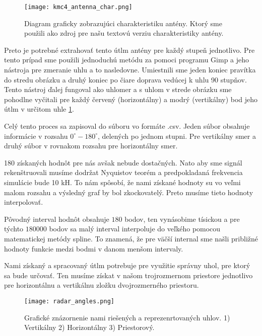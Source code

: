 \documentclass[slovak]{ExcelAtFIT} %
\begin{document}
	\begin{figure}[t]
		\centering
		\texttt{[image: kmc4\_antenna\_char.png]}
		\caption{Diagram graficky zobrazujúci charakteristiku antény. Ktorý sme použili ako zdroj pre našu textovú verziu charakteristiky antény\cite{kmc4sheet}.}
		\label{fig:kmc4_antenna_char}
	\end{figure}

    Preto je potrebné extrahovať tento útlm antény pre každý stupeň jednotlivo. Pre tento prípad sme použili jednoduchú metódu za pomoci programu Gimp a jeho nástroja pre zmeranie uhlu a to nasledovne. Umiestnili sme jeden koniec pravítka do stredu obrázku a druhý koniec po čiare doprava vedúcej k uhlu 90 stupňov. Tento nástroj ďalej fungoval ako uhlomer a s uhlom v strede obrázku sme pohodlne vyčitali pre každý červený (horizontálny) a modrý (vertikálny) bod jeho útlm v určitom uhle \ref{fig:kmc4_antenna_char}.

    Celý tento proces sa zapisoval do súboru vo formáte .csv. Jeden súbor obsahuje informácie v rozsahu $0^{\circ}-180^{\circ}$, delených po jednom stupni. Pre vertikálny smer a druhý súbor v rovnakom rozsahu pre horizontálny smer.

    180 získaných hodnôt pre nás avšak nebude dostačných. Nato aby sme signál rekenštruovali musíme dodržat Nyquistov teorém a predpokladaná frekvencia simulácie bude 10 kH. To nám spôsobí, že nami získané hodnoty su vo veľmi malom rozsahu a výsledný graf by bol zkockovatelý. Preto musíme tieto hodnoty interpolovať.

    Pôvodný interval hodnôt obsahuje $180$ bodov, ten vynásobime tísickou a pre týchto $180 000$ bodov sa malý interval interpoluje do veľkého pomocou matematickej metódy spline. To znamená, že pre väčší internal sme našli približné hodnoty funkcie medzi bodmi v danom menšom intervaly.

    Nami získaný a spracovaný útlm potrebuje pre využitie správny uhol, pre ktorý sa bude určovať. Ten musíme získat v našom trojrozmernom priestore jednotlivo pre horizontálnu a vertikálnu zložku dvojrozmerného priestoru.
    \newline

	\begin{figure}[t]
		\centering
		\texttt{[image: radar\_angles.png]}
		\caption{Grafické znázornenie nami riešených a reprezenrtovaných uhlov. 1) Vertikálny 2) Horizontálny 3) Priestorový.}
		\label{fig:radar_angles}
	\end{figure}
\end{document}
